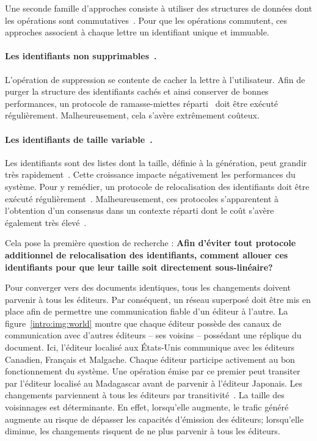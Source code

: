 Une seconde famille d'approches consiste à utiliser des structures de données
dont les opérations sont commutatives~\cite{shapiro2011conflict}. Pour que les
opérations commutent, ces approches associent à chaque lettre un identifiant
unique et immuable.

\paragraph{Les identifiants non supprimables~\cite{oster2006data}.} L'opération
de suppression se contente de cacher la lettre à l'utilisateur. Afin de purger
la structure des identifiants cachés et ainsi conserver de bonnes performances,
un protocole de ramasse-miettes réparti~\cite{abdullahi1998garbage} doit être
exécuté régulièrement. Malheureusement, cela s'avère extrêmement coûteux.

\paragraph{Les identifiants de taille variable~\cite{weiss2009logoot}.} Les
identifiants sont des listes dont la taille, définie à la génération, peut
grandir très rapidement~\cite{weiss2009logoot}. Cette croissance impacte
négativement les performances du système. Pour y remédier, un protocole de
relocalisation des identifiants doit être exécuté
régulièrement~\cite{zawirskiasynchronous}. Malheureusement, ces protocoles
s'apparentent à l'obtention d'un consensus dans un contexte réparti dont le coût
s'avère également très élevé~\cite{mostefaoui2015signature}.

Cela pose la première question de recherche : \textbf{Afin d'éviter tout
  protocole additionnel de relocalisation des identifiants, comment allouer ces
  identifiants pour que leur taille soit directement sous-linéaire?}


Pour converger vers des documents identiques, tous les changements doivent
parvenir à tous les éditeurs. Par conséquent, un réseau superposé doit être mis
en place afin de permettre une communication fiable d'un éditeur à l'autre.  La
figure~\ref{intro:img:world} montre que chaque éditeur possède des canaux de
communication avec d'autres éditeurs -- ses voisins -- possédant une réplique du
document. Ici, l'éditeur localisé aux États-Unis communique avec les éditeurs
Canadien, Français et Malgache. Chaque éditeur participe activement au bon
fonctionnement du système. Une opération émise par ce premier peut transiter par
l'éditeur localisé au Madagascar avant de parvenir à l'éditeur Japonais.  Les
changements parviennent à tous les éditeurs par
transitivité~\cite{birman1999bimodal}.  La taille des voisinnages est
déterminante. En effet, lorsqu'elle augmente, le trafic généré augmente au
risque de dépasser les capacités d'émission des éditeurs; lorsqu'elle diminue,
les changements risquent de ne plus parvenir à tous les éditeurs.

